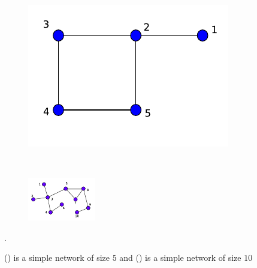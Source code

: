 \documentclass[10pt,a4paper]{article}
\begin{document}
         \begin{figure}[H]
         	\centering
         	\begin{subfigure}[b]{0.35\textwidth}
         		\includegraphics[width= \textwidth]{images/kenel-toymodel.pdf}
         		\caption{}
         		\label{keneltoymodel1}
         	\end{subfigure}~
         	\begin{subfigure}[b]{0.35\textwidth}
         		\includegraphics[width= \textwidth]{images/diffusion-graph.pdf}
         		\caption{}
         		\label{keneltoymodel2}
         	\end{subfigure} 
         	\caption{() is a simple network of size $5$ and () is a simple network of size $10$}.
         	\label{}
         \end{figure}
\end{document}
